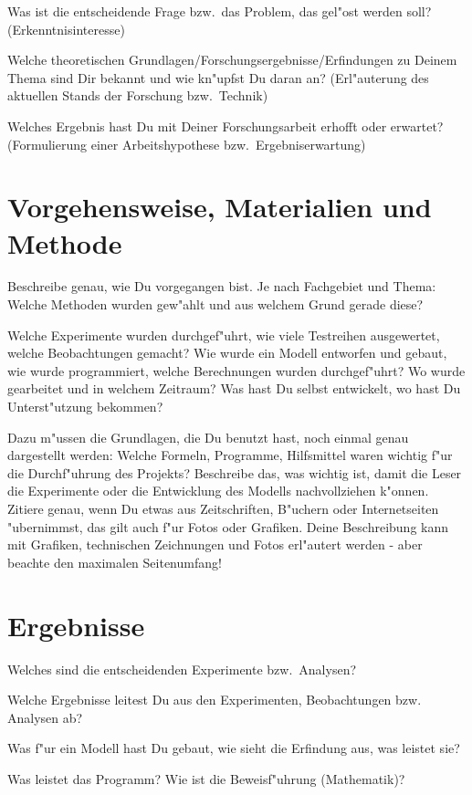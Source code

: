\documentclass[10pt,twoside]{article}  %
\begin{document}
    Was ist die entscheidende Frage bzw.\ das Problem, das gel"ost werden soll?
    (Erkenntnisinteresse)

    Welche theoretischen Grundlagen/Forschungsergebnisse/Erfindungen zu Deinem
    Thema sind Dir bekannt und wie kn"upfst Du daran an? (Erl"auterung des
    aktuellen Stands der Forschung bzw.\ Technik)

    Welches Ergebnis hast Du mit Deiner Forschungsarbeit erhofft oder erwartet?
    (Formulierung einer Arbeitshypothese bzw.\ Ergebniserwartung)

  \section{Vorgehensweise, Materialien und Methode} %
    Beschreibe genau, wie Du vorgegangen bist. Je nach Fachgebiet und Thema:
    Welche Methoden wurden gew"ahlt und aus welchem Grund gerade diese?

    Welche Experimente wurden durchgef"uhrt, wie viele Testreihen ausgewertet,
    welche Beobachtungen gemacht? Wie wurde ein Modell entworfen und gebaut,
    wie wurde programmiert, welche Berechnungen wurden durchgef"uhrt? Wo wurde
    gearbeitet und in welchem Zeitraum? Was hast Du selbst entwickelt, wo hast
    Du Unterst"utzung bekommen?

    Dazu m"ussen die Grundlagen, die Du benutzt hast, noch einmal genau
    dargestellt werden: Welche Formeln, Programme, Hilfsmittel waren wichtig
    f"ur die Durchf"uhrung des Projekts? Beschreibe das, was wichtig ist, damit
    die Leser die Experimente oder die Entwicklung des Modells nachvollziehen
    k"onnen. Zitiere genau, wenn Du etwas aus Zeitschriften, B"uchern oder
    Internetseiten "ubernimmst, das gilt auch f"ur Fotos oder Grafiken. Deine
    Beschreibung kann mit Grafiken, technischen Zeichnungen und Fotos
    erl"autert werden - aber beachte den maximalen Seitenumfang!

  \section{Ergebnisse} %
    Welches sind die entscheidenden Experimente bzw.\ Analysen?

    Welche Ergebnisse leitest Du aus den Experimenten, Beobachtungen bzw.\ %
    Analysen ab?

    Was f"ur ein Modell hast Du gebaut, wie sieht die Erfindung aus, was leistet
    sie?

    Was leistet das Programm? Wie ist die Beweisf"uhrung (Mathematik)?
\end{document}
